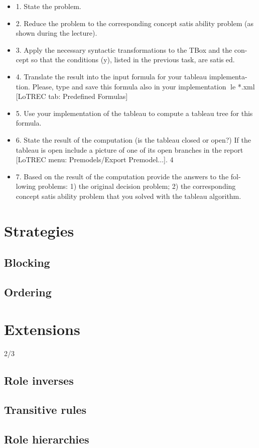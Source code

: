 \documentclass[11pt]{article} %
\begin{document}
\begin{itemize}

\item 1. State the problem.
\item 2. Reduce the problem to the corresponding concept satisability problem
(as shown during the lecture).
\item 3. Apply the necessary syntactic transformations to the TBox and the con-
cept so that the conditions (y), listed in the previous task, are satised.
\item 4. Translate the result into the input formula for your tableau implementa-
tion. Please, type and save this formula also in your implementation le
*.xml [LoTREC tab: Predefined Formulas]
\item 5. Use your implementation of the tableau to compute a tableau tree for this
formula.
\item 6. State the result of the computation (is the tableau closed or open?) If the
tableau is open include a picture of one of its open branches in the report
[LoTREC menu: Premodels/Export Premodel...].
4
\item 7. Based on the result of the computation provide the answers to the fol-
lowing problems: 1) the original decision problem; 2) the corresponding
concept satisability problem that you solved with the tableau algorithm.

\end{itemize}

\section{Strategies}
\label{sec:strategies}

\subsection{Blocking}

\subsection{Ordering}

\section{Extensions}
\label{sec:extensions}

2/3

\subsection{Role inverses}

\subsection{Transitive rules}

\subsection{Role hierarchies}



\end{document}
